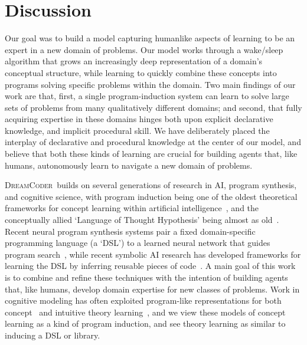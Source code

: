 \documentclass{article}
\newcommand{\system}{\textsc{DreamCoder}~}
\begin{document}
\section{Discussion}

Our goal was to build a model capturing
humanlike aspects of learning to be an expert in a new domain of
problems. Our model works through a wake/sleep algorithm that grows an increasingly deep
representation of a domain's conceptual structure,
while learning to quickly combine these concepts into programs
solving specific problems within the domain.
Two main findings of our work are that, first, a single
program-induction system can learn to solve large sets of problems
from many qualitatively different domains; and second, that fully
acquiring expertise in these domains hinges both upon explicit
declarative knowledge, and implicit procedural skill.  We have
deliberately placed the interplay of declarative and procedural
knowledge at the center of our model, and believe that both these
kinds of learning are crucial for building agents that, like humans,
autonomously learn to navigate a new domain of problems.

\system builds on several generations of research in AI, program synthesis,
and cognitive science, with program induction being one of the oldest
theoretical frameworks for concept learning within artificial
intelligence~\cite{solomonoff1964formal}, and the conceptually allied
`Language of Thought Hypothesis' being almost as
old~\cite{fodor1975language}. Recent neural program synthesis systems
pair a fixed domain-specific programming language (a `DSL') to a
learned neural network that guides program
search~\cite{DBLP:journals/corr/abs-1804-01118,balog2016deepcoder,devlin2017neural}, while recent
symbolic AI research has developed frameworks for learning the DSL by
inferring reusable pieces of
code~\cite{ecc,Dechter:2013:BLV:2540128.2540316,DBLP:conf/icml/LiangJK10,DBLP:conf/ecai/LinDETM14}.
A main goal of this work is to combine and refine these techniques
with the intention of building agents that, like humans, develop
domain expertise for new classes of problems.  Work in cognitive
modeling has often exploited program-like representations for both
concept~\cite{piantadosi2011learning,lake2015human,GoodmanEtAl2015-Chapter} and intuitive theory
learning~\cite{logical,Ullman2012},
and we view these models of concept learning as
a kind of program induction,
and see theory learning as similar to inducing a DSL or library.
\end{document}
